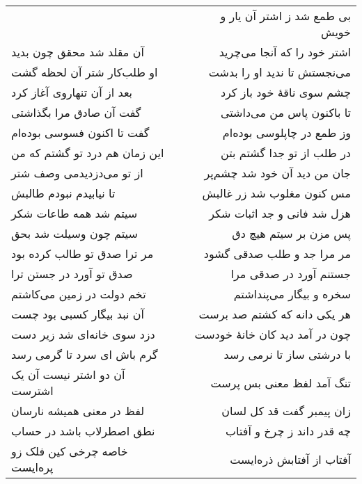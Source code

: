 \begin{center}
\begin{longtable}{l p{0.5cm} r}
&&
بی طمع شد ز اشتر آن یار و خویش
\\
آن مقلد شد محقق چون بدید
&&
اشتر خود را که آنجا می‌چرید
\\
او طلب‌کار شتر آن لحظه گشت
&&
می‌نجستش تا ندید او را بدشت
\\
بعد از آن تنهاروی آغاز کرد
&&
چشم سوی ناقهٔ خود باز کرد
\\
گفت آن صادق مرا بگذاشتی
&&
تا باکنون پاس من می‌داشتی
\\
گفت تا اکنون فسوسی بوده‌ام
&&
وز طمع در چاپلوسی بوده‌ام
\\
این زمان هم درد تو گشتم که من
&&
در طلب از تو جدا گشتم بتن
\\
از تو می‌دزدیدمی وصف شتر
&&
جان من دید آن خود شد چشم‌پر
\\
تا نیابیدم نبودم طالبش
&&
مس کنون مغلوب شد زر غالبش
\\
سیتم شد همه طاعات شکر
&&
هزل شد فانی و جد اثبات شکر
\\
سیتم چون وسیلت شد بحق
&&
پس مزن بر سیتم هیچ دق
\\
مر ترا صدق تو طالب کرده بود
&&
مر مرا جد و طلب صدقی گشود
\\
صدق تو آورد در جستن ترا
&&
جستنم آورد در صدقی مرا
\\
تخم دولت در زمین می‌کاشتم
&&
سخره و بیگار می‌پنداشتم
\\
آن نبد بیگار کسبی بود چست
&&
هر یکی دانه که کشتم صد برست
\\
دزد سوی خانه‌ای شد زیر دست
&&
چون در آمد دید کان خانهٔ خودست
\\
گرم باش ای سرد تا گرمی رسد
&&
با درشتی ساز تا نرمی رسد
\\
آن دو اشتر نیست آن یک اشترست
&&
تنگ آمد لفظ معنی بس پرست
\\
لفظ در معنی همیشه نارسان
&&
زان پیمبر گفت قد کل لسان
\\
نطق اصطرلاب باشد در حساب
&&
چه قدر داند ز چرخ و آفتاب
\\
خاصه چرخی کین فلک زو پره‌ایست
&&
آفتاب از آفتابش ذره‌ایست
\\
\end{longtable}
\end{center}
